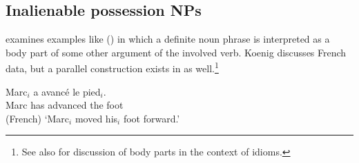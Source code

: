 \documentclass[output=paper,biblatex,babelshorthands,newtxmath,draftmode,colorlinks,citecolor=brown]{langscibook}
\begin{document}






\subsection{Inalienable possession NPs}

\citet{Koenig1999b} examines examples like () in which a definite noun phrase is interpreted
as a body part of some other argument of the involved verb. Koenig discusses French data, but a
parallel construction exists in  as well.\footnote{
See also \crossrefchapterw[\page \pageref{ex-herz-augen}]{idioms} for discussion of body parts in
the context of idioms.
}

\ea
\label{ex-marc-avance-le-pied}
\gll Marc$_i$ a avancé le pied$_i$.\\
     Marc     has advanced the foot\\\hfill{(French)}
\glt `Marc$_i$ moved his$_i$ foot forward.'
\z
\end{document}
